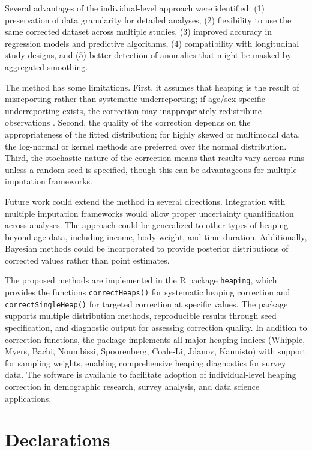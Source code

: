 \documentclass[pdflatex,sn-mathphys-num]{sn-jnl}%
\theoremstyle{thmstyleone}%
\theoremstyle{thmstyletwo}%
\theoremstyle{thmstylethree}%
\begin{document}
Several advantages of the individual-level approach were identified: (1) preservation of data granularity for detailed analyses, (2) flexibility to use the same corrected dataset across multiple studies, (3) improved accuracy in regression models and predictive algorithms, (4) compatibility with longitudinal study designs, and (5) better detection of anomalies that might be masked by aggregated smoothing.

The method has some limitations. First, it assumes that heaping is the result of misreporting rather than systematic underreporting; if age/sex-specific underreporting exists, the correction may inappropriately redistribute observations \citep{preston1999}. Second, the quality of the correction depends on the appropriateness of the fitted distribution; for highly skewed or multimodal data, the log-normal or kernel methods are preferred over the normal distribution. Third, the stochastic nature of the correction means that results vary across runs unless a random seed is specified, though this can be advantageous for multiple imputation frameworks.

Future work could extend the method in several directions. Integration with multiple imputation frameworks would allow proper uncertainty quantification across analyses. The approach could be generalized to other types of heaping beyond age data, including income, body weight, and time duration. Additionally, Bayesian methods could be incorporated to provide posterior distributions of corrected values rather than point estimates.

The proposed methods are implemented in the R package \texttt{heaping}, which provides the functions \texttt{correctHeaps()} for systematic heaping correction and \texttt{correctSingleHeap()} for targeted correction at specific values. The package supports multiple distribution methods, reproducible results through seed specification, and diagnostic output for assessing correction quality. In addition to correction functions, the package implements all major heaping indices (Whipple, Myers, Bachi, Noumbissi, Spoorenberg, Coale-Li, Jdanov, Kannisto) with support for sampling weights, enabling comprehensive heaping diagnostics for survey data. The software is available to facilitate adoption of individual-level heaping correction in demographic research, survey analysis, and data science applications.


\section*{Declarations}
\end{document}
